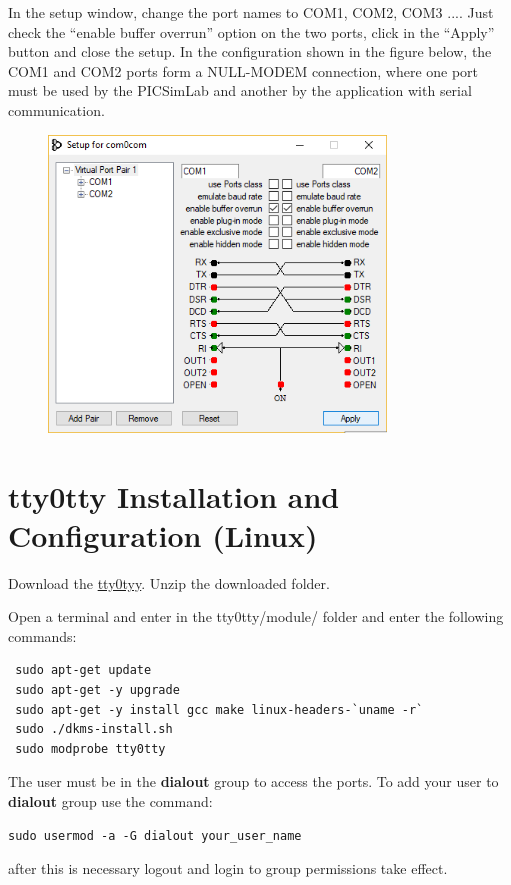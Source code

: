 In the setup window, change the port names to COM1, COM2, COM3 ....
Just check the ``enable buffer overrun'' option on the two ports, click in the ``Apply'' button and close the setup.
In the configuration shown in the figure below, the COM1 and COM2 ports form a NULL-MODEM connection, where one port must be used by the PICSimLab and another by the application with serial communication.
\begin{figure}[H]
\center
\includegraphics[width=0.8\textwidth]{img/com0com3.png} 
\end{figure} 
 
\section{tty0tty Installation and Configuration (Linux)}
 
Download the \href{https://github.com/lcgamboa/tty0tty/archive/master.zip}{tty0tyy}.
Unzip the downloaded folder.
 
Open a terminal and enter in the tty0tty/module/ folder and enter the following commands:
\begin{verbatim}
 sudo apt-get update
 sudo apt-get -y upgrade
 sudo apt-get -y install gcc make linux-headers-`uname -r` 
 sudo ./dkms-install.sh
 sudo modprobe tty0tty
\end{verbatim}

The user must be in the \textbf{dialout} group to access the ports. 
To add your user to \textbf{dialout} group use the command:
\begin{verbatim}
sudo usermod -a -G dialout your_user_name
\end{verbatim}
after this is necessary logout and login to group permissions take effect.


